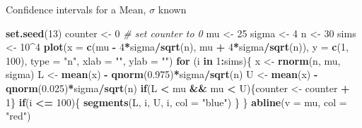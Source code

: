 \documentclass[
  ignorenonframetext,
]{beamer}
\newenvironment{Shaded}{\begin{snugshade}}{\end{snugshade}}
\newcommand{\AttributeTok}[1]{\textcolor[rgb]{0.13,0.29,0.53}{#1}}
\newcommand{\CommentTok}[1]{\textcolor[rgb]{0.56,0.35,0.01}{\textit{#1}}}
\newcommand{\ControlFlowTok}[1]{\textcolor[rgb]{0.13,0.29,0.53}{\textbf{#1}}}
\newcommand{\DecValTok}[1]{\textcolor[rgb]{0.00,0.00,0.81}{#1}}
\newcommand{\FloatTok}[1]{\textcolor[rgb]{0.00,0.00,0.81}{#1}}
\newcommand{\FunctionTok}[1]{\textcolor[rgb]{0.13,0.29,0.53}{\textbf{#1}}}
\newcommand{\NormalTok}[1]{#1}
\newcommand{\OtherTok}[1]{\textcolor[rgb]{0.56,0.35,0.01}{#1}}
\newcommand{\SpecialCharTok}[1]{\textcolor[rgb]{0.81,0.36,0.00}{\textbf{#1}}}
\newcommand{\StringTok}[1]{\textcolor[rgb]{0.31,0.60,0.02}{#1}}
\begin{document}
\begin{frame}[fragile]{Confidence intervals for a Mean, \(\sigma\)
known}
\label{confidence-intervals-for-a-mean-sigma-known-5}
\normalsize

\begin{Shaded}
\begin{Highlighting}[]
\FunctionTok{set.seed}\NormalTok{(}\DecValTok{13}\NormalTok{)}
\NormalTok{counter }\OtherTok{\textless{}{-}} \DecValTok{0} \CommentTok{\# set counter to 0}
\NormalTok{mu }\OtherTok{\textless{}{-}} \DecValTok{25}
\NormalTok{sigma }\OtherTok{\textless{}{-}} \DecValTok{4}
\NormalTok{n }\OtherTok{\textless{}{-}} \DecValTok{30}
\NormalTok{sims }\OtherTok{\textless{}{-}} \DecValTok{10}\SpecialCharTok{\^{}}\DecValTok{4}
\FunctionTok{plot}\NormalTok{(}\AttributeTok{x =} \FunctionTok{c}\NormalTok{(mu }\SpecialCharTok{{-}} \DecValTok{4}\SpecialCharTok{*}\NormalTok{sigma}\SpecialCharTok{/}\FunctionTok{sqrt}\NormalTok{(n), mu }\SpecialCharTok{+} \DecValTok{4}\SpecialCharTok{*}\NormalTok{sigma}\SpecialCharTok{/}\FunctionTok{sqrt}\NormalTok{(n)), }
     \AttributeTok{y =} \FunctionTok{c}\NormalTok{(}\DecValTok{1}\NormalTok{, }\DecValTok{100}\NormalTok{), }\AttributeTok{type =} \StringTok{"n"}\NormalTok{, }\AttributeTok{xlab =} \StringTok{""}\NormalTok{, }\AttributeTok{ylab =} \StringTok{""}\NormalTok{)}
\ControlFlowTok{for}\NormalTok{ (i }\ControlFlowTok{in} \DecValTok{1}\SpecialCharTok{:}\NormalTok{sims)\{}
\NormalTok{ x }\OtherTok{\textless{}{-}} \FunctionTok{rnorm}\NormalTok{(n, mu, sigma)}
\NormalTok{ L }\OtherTok{\textless{}{-}} \FunctionTok{mean}\NormalTok{(x) }\SpecialCharTok{{-}} \FunctionTok{qnorm}\NormalTok{(}\FloatTok{0.975}\NormalTok{)}\SpecialCharTok{*}\NormalTok{sigma}\SpecialCharTok{/}\FunctionTok{sqrt}\NormalTok{(n)}
\NormalTok{ U }\OtherTok{\textless{}{-}} \FunctionTok{mean}\NormalTok{(x) }\SpecialCharTok{{-}} \FunctionTok{qnorm}\NormalTok{(}\FloatTok{0.025}\NormalTok{)}\SpecialCharTok{*}\NormalTok{sigma}\SpecialCharTok{/}\FunctionTok{sqrt}\NormalTok{(n)}
 \ControlFlowTok{if}\NormalTok{(L }\SpecialCharTok{\textless{}}\NormalTok{ mu }\SpecialCharTok{\&\&}\NormalTok{ mu }\SpecialCharTok{\textless{}}\NormalTok{ U)\{counter }\OtherTok{\textless{}{-}}\NormalTok{ counter }\SpecialCharTok{+} \DecValTok{1}\NormalTok{\}}
 \ControlFlowTok{if}\NormalTok{(i }\SpecialCharTok{\textless{}=} \DecValTok{100}\NormalTok{)\{}
 \FunctionTok{segments}\NormalTok{(L, i, U, i, }\AttributeTok{col =} \StringTok{"blue"}\NormalTok{)}
\NormalTok{ \}}
\NormalTok{\}}
\FunctionTok{abline}\NormalTok{(}\AttributeTok{v =}\NormalTok{ mu, }\AttributeTok{col =} \StringTok{"red"}\NormalTok{)}
\end{Highlighting}
\end{Shaded}

\normalsize
\end{frame}
\end{document}
